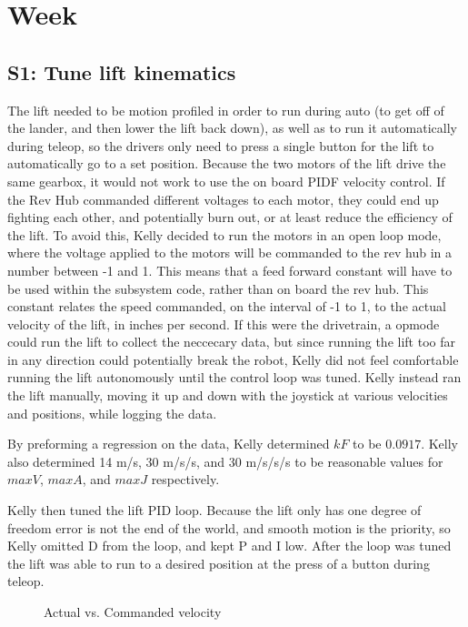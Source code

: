 \documentclass{article}
\begin{document}
\clearpage \newpage \section{Week \thesection} 
\subsection{S1: Tune lift kinematics}

The lift needed to be motion profiled in order to run during auto (to get off of the lander, and then lower the lift back down), as well as to run it automatically during teleop, so the drivers only need to press a single button for the lift to automatically go to a set position. Because the two motors of the lift drive the same gearbox, it would not work to use the on board PIDF velocity control. If the Rev Hub commanded different voltages to each motor, they could end up fighting each other, and potentially burn out, or at least reduce the efficiency of the lift. To avoid this, Kelly decided to run the motors in an open loop mode, where the voltage applied to the motors will be commanded to the rev hub in a number between -1 and 1. This means that a feed forward constant will have to be used within the subsystem code, rather than on board the rev hub. This constant relates the speed commanded, on the interval of -1 to 1, to the actual velocity of the lift, in inches per second. If this were the drivetrain, a opmode could run the lift to collect the neccecary data, but since running the lift too far in any direction could potentially break the robot, Kelly did not feel comfortable running the lift autonomously until the control loop was tuned. Kelly instead ran the lift manually, moving it up and down with the joystick at various velocities and positions, while logging the data. 

By preforming a regression on the data, Kelly determined $kF$ to be $0.0917$. Kelly also determined 14 m/s, 30 m/s/s, and 30 m/s/s/s to be reasonable values for $maxV$, $maxA$, and $maxJ$ respectively.

Kelly then tuned the lift PID loop. Because the lift only has one degree of freedom error is not the end of the world, and smooth motion is the priority, so Kelly omitted D from the loop, and kept P and I low. After the loop was tuned the lift was able to run to a desired position at the press of a button during teleop.

\begin {figure}
\centering
{}
\caption {Actual vs. Commanded velocity}
\label {fig:graph}
\end{figure}
\end{document}

